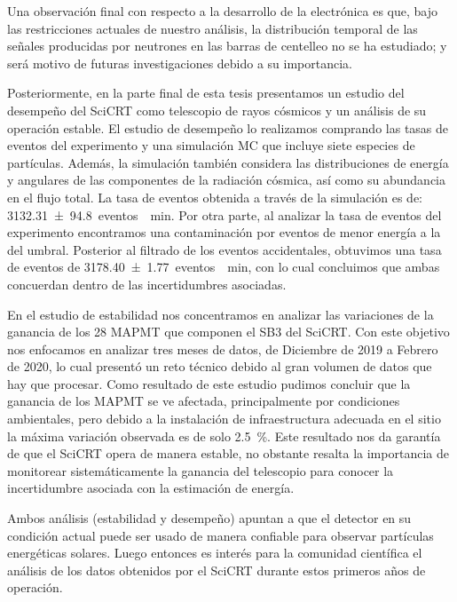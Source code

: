 Una observación final con respecto a la desarrollo de la electrónica es que, bajo las restricciones actuales de nuestro análisis, la distribución temporal de las señales producidas por neutrones en las barras de centelleo no se ha estudiado; y será motivo de futuras investigaciones debido a su importancia.

Posteriormente, en la parte final de esta tesis presentamos un estudio del desempeño del SciCRT como telescopio de rayos cósmicos y un análisis de su operación estable. El estudio de desempeño lo realizamos comprando las tasas de eventos del experimento y una simulación MC que incluye siete especies de partículas. Además, la simulación también considera las distribuciones de energía y angulares de las componentes de la radiación cósmica, así como su abundancia en el flujo total. La tasa de eventos obtenida a través de la simulación es de: \SI{3132.31(9480)}{eventos \per\minute}. Por otra parte, al analizar la tasa de eventos del  experimento encontramos una contaminación por eventos de menor energía a la del umbral. Posterior al filtrado de los eventos accidentales, obtuvimos una tasa de eventos de \SI{3178.40(177)}{eventos \per\minute}, con lo cual concluimos que ambas concuerdan dentro de las incertidumbres asociadas.

En el estudio de estabilidad nos concentramos en analizar las variaciones de la ganancia de los \num{28} MAPMT que componen el SB3 del SciCRT. Con este objetivo nos enfocamos en analizar tres meses de datos, de Diciembre de \num{2019} a Febrero de \num{2020}, lo cual presentó un reto técnico debido al gran volumen de datos que hay que procesar. Como resultado de este estudio pudimos concluir que la ganancia de los MAPMT se ve afectada, principalmente por condiciones ambientales, pero debido a la instalación de infraestructura adecuada en el sitio la máxima variación observada es de solo \SI{2.5}{\percent}. Este resultado nos da garantía de que el SciCRT opera de manera estable, no obstante resalta la importancia de monitorear sistemáticamente la ganancia del telescopio para conocer la incertidumbre asociada con la estimación de energía.

Ambos análisis (estabilidad y desempeño) apuntan a que el detector en su condición actual puede ser usado de manera confiable para observar partículas energéticas solares. Luego entonces es interés para la comunidad científica el análisis de los datos obtenidos por el SciCRT durante estos primeros años de operación.

